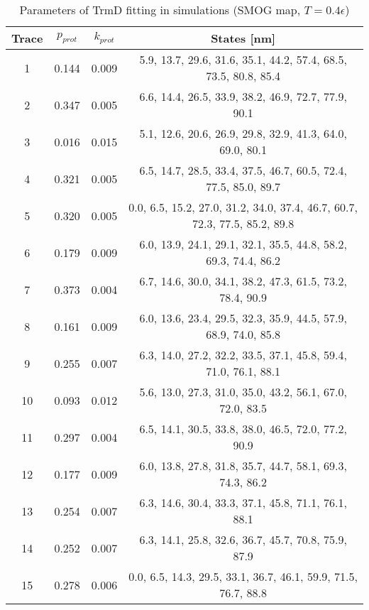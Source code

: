 \begin{table}
    \tiny
    \centering
    \caption{Parameters of TrmD fitting in simulations (SMOG map, $T=0.4\epsilon$)}
    \label{tab:trmd-sc-parameters}
    \begin{tabular}{c|c|c|c}
        \textbf{Trace} & \textbf{$p_{prot}$} & \textbf{$k_{prot}$} & \textbf{States [nm]}\\\hline
        1 & 0.144 & 0.009 & 5.9, 13.7, 29.6, 31.6, 35.1, 44.2, 57.4, 68.5, 73.5, 80.8, 85.4\\
        2 & 0.347 & 0.005 & 6.6, 14.4, 26.5, 33.9, 38.2, 46.9, 72.7, 77.9, 90.1\\
        3 & 0.016 & 0.015 & 5.1, 12.6, 20.6, 26.9, 29.8, 32.9, 41.3, 64.0, 69.0, 80.1\\
        4 & 0.321 & 0.005 & 6.5, 14.7, 28.5, 33.4, 37.5, 46.7, 60.5, 72.4, 77.5, 85.0, 89.7\\
        5 & 0.320 & 0.005 & 0.0, 6.5, 15.2, 27.0, 31.2, 34.0, 37.4, 46.7, 60.7, 72.3, 77.5, 85.2, 89.8\\
        6 & 0.179 & 0.009 & 6.0, 13.9, 24.1, 29.1, 32.1, 35.5, 44.8, 58.2, 69.3, 74.4, 86.2\\
        7 & 0.373 & 0.004 & 6.7, 14.6, 30.0, 34.1, 38.2, 47.3, 61.5, 73.2, 78.4, 90.9\\
        8 & 0.161 & 0.009 & 6.0, 13.6, 23.4, 29.5, 32.3, 35.9, 44.5, 57.9, 68.9, 74.0, 85.8\\
        9 & 0.255 & 0.007 & 6.3, 14.0, 27.2, 32.2, 33.5, 37.1, 45.8, 59.4, 71.0, 76.1, 88.1\\
        10 & 0.093 & 0.012 & 5.6, 13.0, 27.3, 31.0, 35.0, 43.2, 56.1, 67.0, 72.0, 83.5\\
        11 & 0.297 & 0.004 & 6.5, 14.1, 30.5, 33.8, 38.0, 46.5, 72.0, 77.2, 90.9\\
        12 & 0.177 & 0.009 & 6.0, 13.8, 27.8, 31.8, 35.7, 44.7, 58.1, 69.3, 74.3, 86.2\\
        13 & 0.254 & 0.007 & 6.3, 14.6, 30.4, 33.3, 37.1, 45.8, 71.1, 76.1, 88.1\\
        14 & 0.252 & 0.007 & 6.3, 14.1, 25.8, 32.6, 36.7, 45.7, 70.8, 75.9, 87.9\\
        15 & 0.278 & 0.006 & 0.0, 6.5, 14.3, 29.5, 33.1, 36.7, 46.1, 59.9, 71.5, 76.7, 88.8\\\hline
    \end{tabular}
\end{table}


